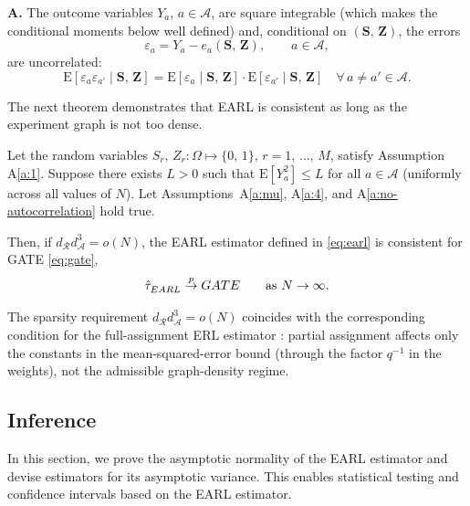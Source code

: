 \documentclass[sigconf]{acmart}
\newcounter{assumption}
\newenvironment{assumption}{\refstepcounter{assumption}\par\medskip\noindent\textbf{A\theassumption.}\enspace}{\par\medskip}
\newcommand{\E}{\mathrm E}
\begin{document}
\begin{assumption}\label{a:no-autocorrelation} The outcome variables $Y_a$, $a\in\mathcal A$, are square integrable (which makes the conditional moments below well defined) and, conditional on $(\mathbf S,\,\mathbf Z)$, the errors
\begin{equation}\label{def:epsa}
    \varepsilon_a = Y_a - e_a(\mathbf{S},\,\mathbf{Z}),\qquad a\in\mathcal{A},
\end{equation}
are uncorrelated:
\begin{equation*}
    \E[\varepsilon_a \varepsilon_{a'}\mid \mathbf{S},\,\mathbf{Z}] = \E[\varepsilon_a\mid \mathbf{S},\,\mathbf{Z}] \cdot \E[\varepsilon_{a'}\mid \mathbf{S},\,\mathbf{Z}]\quad \forall\,a\neq a'\in\mathcal{A}.
\end{equation*}
\end{assumption}

The next theorem demonstrates that EARL is consistent as long as the experiment graph is not too dense.
\begin{theorem}\label{th:consistency}
    Let the random variables $S_r,\,Z_r\colon\Omega\mapsto\{0,\,1\}$, $r=1,\,\ldots,\,M$, satisfy Assumption A\ref{a:1}. Suppose there exists $L>0$ such that $\E[Y_a^2] \le L$ for all $a\in\mathcal A$ (uniformly across all values of $N$). Let Assumptions~A\ref{a:mu}, A\ref{a:4}, and A\ref{a:no-autocorrelation} hold true.

    Then, if $d^{\phantom{1}}_{\mathcal{R}}d^3_{\mathcal{A}}=o(N)$, the EARL estimator defined in \eqref{eq:earl} is consistent for GATE \eqref{eq:gate},
    \begin{equation*}
        \hat\tau^{\phantom{1}}_{EARL} \stackrel{p}{\to} GATE\qquad \textup{as }N\to\infty.
    \end{equation*}
\end{theorem}

The sparsity requirement $d_{\mathcal R}^{\phantom{1}}d_{\mathcal A}^3=o(N)$ coincides with the corresponding condition for the full-assignment ERL estimator \cite[Theorem~4.2]{harshaw2023erl}: partial assignment affects only the constants in the mean-squared-error bound (through the factor $q^{-1}$ in the weights), not the admissible graph-density regime.

\subsection{Inference}\label{subsec:inference}
In this section, we prove the asymptotic normality of the EARL estimator and devise estimators for its asymptotic variance. This enables statistical testing and confidence intervals based on the EARL estimator.
\end{document}
